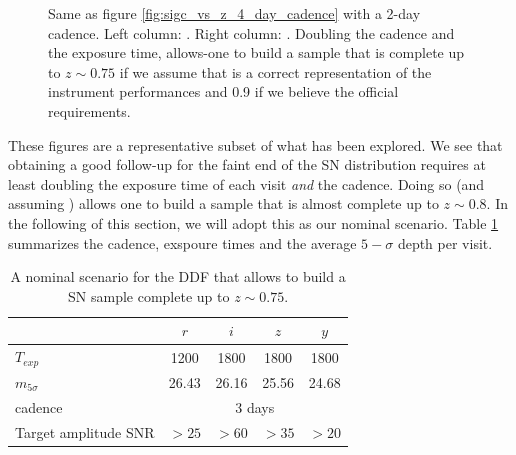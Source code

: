 \documentclass[\docopts]{\docclass}
\begin{document}
\begin{figure}
\begin{center}
\end{center}
\caption{Same as figure \ref{fig:sigc_vs_z_4_day_cadence} with a 2-day
  cadence.  Left column: .  Right column:
  .  Doubling the cadence and the exposure time,
  allows-one to build a sample that is complete up to $z \sim 0.75$ if
  we assume that  is a correct representation of the
  instrument performances and 0.9 if we believe the official
   requirements.}
\label{fig:sigc_vs_z_2_day_cadence}
\end{figure}

These figures are a representative subset of what has been explored.
We see that obtaining a good follow-up for the faint end of the SN
distribution requires at least doubling the exposure time of each
visit {\em and} the cadence. Doing so (and assuming )
allows one to build a sample that is almost complete up to $z \sim
0.8$. In the following of this section, we will adopt this as our
nominal scenario. Table \ref{tab:nominal_scenario_DDF} summarizes the
cadence, exspoure times and the average $5-\sigma$ depth per visit.

\begin{table}
\begin{center}
\caption{A nominal scenario for the DDF that allows to build a SN
  sample complete up to $z \sim 0.75$.}
\label{tab:nominal_scenario_DDF}
\begin{tabular}{l|cccc}
\hline
\hline
              & $r$ & $i$ & $z$ & $y$ \\
\hline 
$T_{exp}$      & 1200 & 1800 & 1800 & 1800 \\
$m_{5\sigma}$  & 26.43    & 26.16    &  25.56    &  24.68   \\
cadence       &  \multicolumn{4}{c}{3 days} \\
Target amplitude SNR & $>25$ & $>60$ & $>35$ & $>20$ \\
\hline
\end{tabular}
\end{center}
\end{table}
\end{document}
